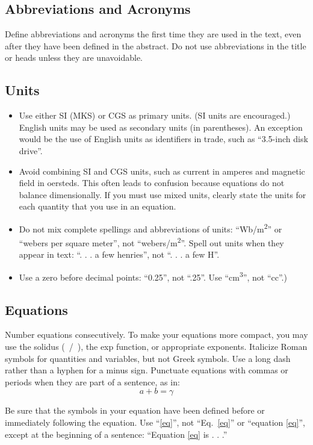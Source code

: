 \documentclass[conference]{IEEEtran}
\begin{document}
\subsection{Abbreviations and Acronyms}\label{AA}
Define abbreviations and acronyms the first time they are used in the text, 
even after they have been defined in the abstract. Do not use 
abbreviations in the title or heads unless they are unavoidable.

\subsection{Units}
\begin{itemize}
\item Use either SI (MKS) or CGS as primary units. (SI units are encouraged.) English units may be used as secondary units (in parentheses). An exception would be the use of English units as identifiers in trade, such as ``3.5-inch disk drive''.
\item Avoid combining SI and CGS units, such as current in amperes and magnetic field in oersteds. This often leads to confusion because equations do not balance dimensionally. If you must use mixed units, clearly state the units for each quantity that you use in an equation.
\item Do not mix complete spellings and abbreviations of units: ``Wb/m\textsuperscript{2}'' or ``webers per square meter'', not ``webers/m\textsuperscript{2}''. Spell out units when they appear in text: ``. . . a few henries'', not ``. . . a few H''.
\item Use a zero before decimal points: ``0.25'', not ``.25''. Use ``cm\textsuperscript{3}'', not ``cc''.)
\end{itemize}

\subsection{Equations}
Number equations consecutively. To make your 
equations more compact, you may use the solidus (~/~), the exp function, or 
appropriate exponents. Italicize Roman symbols for quantities and variables, 
but not Greek symbols. Use a long dash rather than a hyphen for a minus 
sign. Punctuate equations with commas or periods when they are part of a 
sentence, as in:
\begin{equation}
a+b=\gamma\label{eq}
\end{equation}

Be sure that the 
symbols in your equation have been defined before or immediately following 
the equation. Use ``\eqref{eq}'', not ``Eq.~\eqref{eq}'' or ``equation \eqref{eq}'', except at 
the beginning of a sentence: ``Equation \eqref{eq} is . . .''
\end{document}
